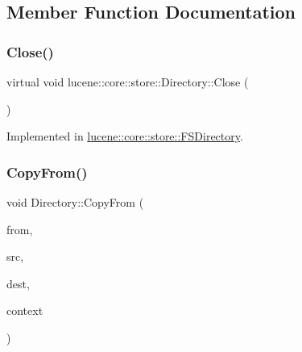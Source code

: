 \subsection{Member Function Documentation}
\mbox{\label{classlucene_1_1core_1_1store_1_1Directory_aa803c099bd4963d2ed83dbe10152d909}} 
\subsubsection{\texorpdfstring{Close()}{Close()}}
{\footnotesize\ttfamily virtual void lucene\+::core\+::store\+::\+Directory\+::\+Close (\begin{DoxyParamCaption}{ }\end{DoxyParamCaption})\hspace{0.3cm}{\ttfamily [pure virtual]}}



Implemented in \mbox{\hyperlink{classlucene_1_1core_1_1store_1_1FSDirectory_a5d0ea9b7fb90cbf6647276089a95b1a8}{lucene\+::core\+::store\+::\+F\+S\+Directory}}.

\mbox{\label{classlucene_1_1core_1_1store_1_1Directory_a1b531f282e9f4d200bdd6e663701ff9c}} 
\subsubsection{\texorpdfstring{Copy\+From()}{CopyFrom()}}
{\footnotesize\ttfamily void Directory\+::\+Copy\+From (\begin{DoxyParamCaption}\item[{\mbox{\hyperlink{classlucene_1_1core_1_1store_1_1Directory}{Directory}} \&}]{from,  }\item[{\mbox{\hyperlink{ZlibCrc32_8h_a2c212835823e3c54a8ab6d95c652660e}{const}} std\+::string \&}]{src,  }\item[{\mbox{\hyperlink{ZlibCrc32_8h_a2c212835823e3c54a8ab6d95c652660e}{const}} std\+::string \&}]{dest,  }\item[{\mbox{\hyperlink{ZlibCrc32_8h_a2c212835823e3c54a8ab6d95c652660e}{const}} \mbox{\hyperlink{classlucene_1_1core_1_1store_1_1IOContext}{I\+O\+Context}} \&}]{context }\end{DoxyParamCaption})}

